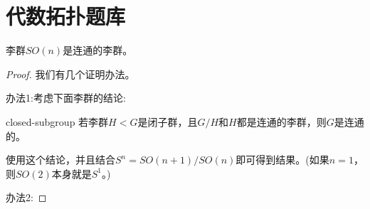 \documentclass{package/fancy-book}
\begin{document}
\section{代数拓扑题库}
\begin{theorem}[$SO(n)$的连通性]
    李群$SO(n)$是连通的李群。
\end{theorem}
\begin{proof}
    我们有几个证明办法。

    办法1:考虑下面李群的结论:
    \begin{proposition}{closed-subgroup}
        若李群$H<G$是闭子群，且$G/H$和$H$都是连通的李群，则$G$是连通的。
    \end{proposition}
    使用这个结论，并且结合$S^n=SO(n+1)/SO(n)$即可得到结果。(如果$n=1$，则$SO(2)$本身就是$S^1$。)

    办法2:
\end{proof}
\end{document}
